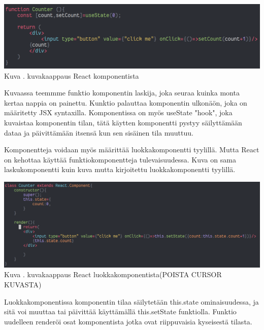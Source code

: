 \bigskip
\includegraphics[width=15cm]{src/public/oppar/function_component.png}\\
Kuva \getImgCount{}. kuvakaappaus React komponentista
\medskip

Kuvaassa teemmme funktio komponentin laskija, joka seuraa kuinka monta kertaa nappia on painettu.
Kunktio palauttaa komponentin ulkonäön, joka on määritetty JSX syntaxilla.
Komponentissa on myös useState "hook"{}, joka kuvaistaa komponentin tilan, tätä käytten komponentti pystyy säilyttämään dataa ja päivittämään itsensä kun sen sisäinen tila muuttuu.
\medskip

Komponentteja voidaan myös määrittää luokkakomponentti tyylillä. Mutta React on kehottaa käyttää funktiokomponentteja tulevaisuudessa. 
Kuva \nextImageCount {} on sama laskukomponentti kuin kuva \theimgCounter{} mutta kirjoitettu luokkakomponentti tyylillä. 
\medskip
\bigskip


\includegraphics[width=15cm]{src/public/oppar/class_.png}\\
Kuva \getImgCount{}. kuvakaappaus React luokkakomponentista(POISTA CURSOR KUVASTA)
\medskip



Luokkakomponentissa komponentin tilaa säilytetään this.state ominaisuudessa, ja sitä voi muuttaa tai päivittää käyttämällä this.setState funktiolla. 
Funktio uudelleen renderöi osat komponentista jotka ovat riippuvaisia kyseisestä tilasta.
\medskip

